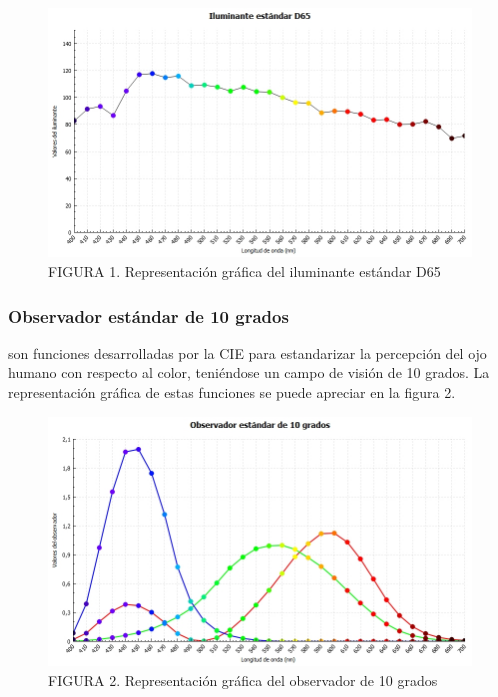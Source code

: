 \documentclass[conference]{IEEEtran}
\begin{document}
\begin{figure}[h]
  \includegraphics[scale=.4]{./img/curva-iluminante.jpg}
  \caption{FIGURA 1. Representaci\'{o}n gr\'{a}fica del iluminante est\'{a}ndar D65}
\end{figure}\label{fig:iluminante}
		
		\subsubsection{Observador est\'{a}ndar de 10 grados}
		
		son funciones desarrolladas por la CIE \cite{CIE-report} para estandarizar la percepci\'{o}n del ojo humano con respecto al color, teni\'{e}ndose un campo de visi\'{o}n de 10 grados. La representaci\'{o}n gr\'{a}fica de estas funciones se puede apreciar en la figura 2.
		
\FloatBarrier

\begin{figure}[h]
  \includegraphics[scale=.4]{./img/curva-observador.jpg}
  \caption{FIGURA 2. Representaci\'{o}n gr\'{a}fica del observador de 10 grados}
\end{figure}
	
\end{document}
